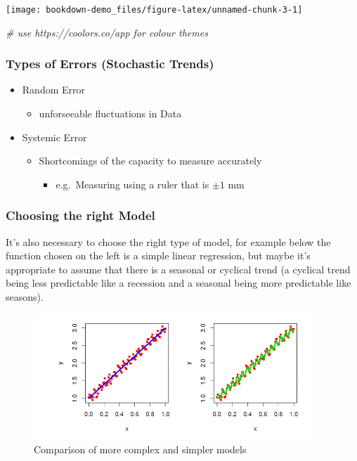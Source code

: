 \documentclass[]{book}
\newenvironment{Shaded}{\begin{snugshade}}{\end{snugshade}}
\newcommand{\CommentTok}[1]{\textcolor[rgb]{0.56,0.35,0.01}{\textit{#1}}}
\providecommand{\tightlist}{%
  \setlength{\itemsep}{0pt}\setlength{\parskip}{0pt}}
\begin{document}
\texttt{[image: bookdown-demo\_files/figure-latex/unnamed-chunk-3-1]}

\begin{Shaded}
\begin{Highlighting}[]
  \CommentTok{# use https://coolors.co/app for colour themes}
\end{Highlighting}
\end{Shaded}

\hypertarget{types-of-errors-stochastic-trends}{%
\subsubsection{Types of Errors (Stochastic Trends)}\label{types-of-errors-stochastic-trends}}

\begin{itemize}
\tightlist
\item
  Random Error

  \begin{itemize}
  \tightlist
  \item
    unforseeable fluctuations in Data
  \end{itemize}
\item
  Systemic Error

  \begin{itemize}
  \tightlist
  \item
    Shortcomings of the capacity to measure accurately

    \begin{itemize}
    \tightlist
    \item
      e.g.~Measuring using a ruler that is \(\pm1 \text{ mm}\)
    \end{itemize}
  \end{itemize}
\end{itemize}

\hypertarget{choosing-the-right-model}{%
\subsubsection{Choosing the right Model}\label{choosing-the-right-model}}

It's also necessary to choose the right type of model, for example below the function chosen on the left is a simple linear regression, but maybe it's appropriate to assume that there is a seasonal or cyclical trend (a cyclical trend being less predictable like a recession and a seasonal being more predictable like seasons).

\begin{figure}
\centering
\includegraphics{images/Cycvsseas400px.jpg}
\caption{Comparison of more complex and simpler models}
\end{figure}
\end{document}
